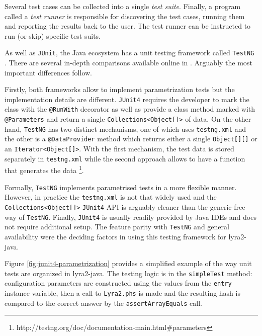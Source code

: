 Several test cases can be collected into a single \emph{test suite}. Finally, a program called a \emph{test runner} is responsible for discovering the test cases, running them and reporting the results back to the user. The test runner can be instructed to run (or skip) specific test suits.

As well as \texttt{JUnit}, the Java ecosystem has a unit testing framework called \texttt{TestNG} \cite{testng:2017:home}. There are several in-depth comparisons available online in \cite{mkyong:2017:testng-vs-junit, wiki:2017:testng-vs-junit}. Arguably the most important differences follow.

Firstly, both frameworks allow to implement parametrization tests but the implementation details are different.  \texttt{JUnit4} requires the developer to mark the class with the \texttt{@RunWith} decorator as well as provide a class method marked with \texttt{@Parameters} and return a single \texttt{Collections<Object[]>} of data. On the other hand, \texttt{TestNG} has two distinct mechanisms, one of which uses \texttt{testng.xml} and the other is a \texttt{@DataProvider} method which returns either a single \texttt{Object[][]} or an \texttt{Iterator<Object[]>}. With the first mechanism, the test data is stored separately in \texttt{testng.xml} while the second approach allows to have a function that generates the data \footnote{http://testng.org/doc/documentation-main.html\#parameters}.

Formally, \texttt{TestNG} implements parametrised tests in a more flexible manner. However, in practice the \texttt{testng.xml} is not that widely used and the \texttt{Collections<Object[]>} \texttt{JUnit4} API is arguably cleaner than the generic-free way of \texttt{TestNG}. Finally, \texttt{JUnit4} is usually readily provided by Java IDEs and does not require additional setup. The feature parity with \texttt{TestNG} and general availability were the deciding factors in using this testing framework for lyra2-java.

Figure \ref{fig:junit4-parametrization} provides a simplified example of the way unit tests are organized in lyra2-java. The testing logic is in the \texttt{simpleTest} method: configuration parameters are constructed using the values from the \texttt{entry} instance variable, then a call to \texttt{Lyra2.phs} is made and the resulting hash is compared to the correct answer by the \texttt{assertArrayEquals} call.

